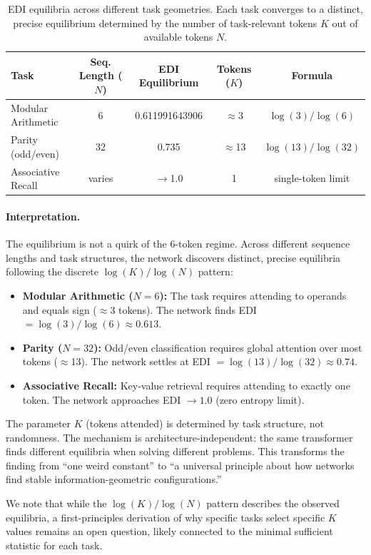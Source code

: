 \begin{table}[h]
\centering
\caption{EDI equilibria across different task geometries. Each task converges to a distinct, precise equilibrium determined by the number of task-relevant tokens $K$ out of available tokens $N$.}
\label{tab:task-geometry}
\begin{tabular}{lcccc}
\toprule
Task & Seq. Length ($N$) & EDI Equilibrium & Tokens ($K$) & Formula \\
\midrule
Modular Arithmetic & 6 & 0.611991643906 & $\approx$3 & $\log(3)/\log(6)$ \\
Parity (odd/even) & 32 & 0.735 & $\approx$13 & $\log(13)/\log(32)$ \\
Associative Recall & varies & $\to$1.0 & 1 & single-token limit \\
\bottomrule
\end{tabular}
\end{table}

\paragraph{Interpretation.}
The equilibrium is not a quirk of the 6-token regime. Across different sequence lengths and task structures, the network discovers distinct, precise equilibria following the discrete $\log(K)/\log(N)$ pattern:
\begin{itemize}
    \item \textbf{Modular Arithmetic ($N=6$):} The task requires attending to operands and equals sign ($\approx$3 tokens). The network finds EDI $= \log(3)/\log(6) \approx 0.613$.
    \item \textbf{Parity ($N=32$):} Odd/even classification requires global attention over most tokens ($\approx$13). The network settles at EDI $= \log(13)/\log(32) \approx 0.74$.
    \item \textbf{Associative Recall:} Key-value retrieval requires attending to exactly one token. The network approaches EDI $\to 1.0$ (zero entropy limit).
\end{itemize}

The parameter $K$ (tokens attended) is determined by task structure, not randomness. The mechanism is architecture-independent: the same transformer finds different equilibria when solving different problems. This transforms the finding from ``one weird constant'' to ``a universal principle about how networks find stable information-geometric configurations.''

We note that while the $\log(K)/\log(N)$ pattern describes the observed equilibria, a first-principles derivation of why specific tasks select specific $K$ values remains an open question, likely connected to the minimal sufficient statistic for each task.

